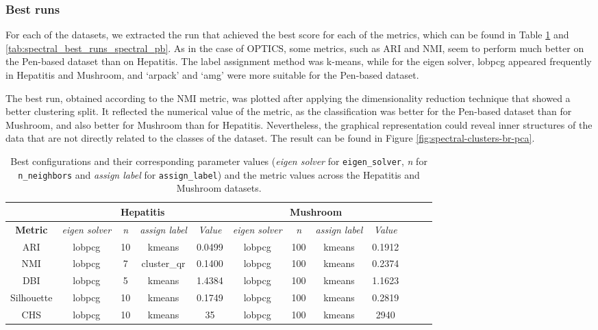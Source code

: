 \subsubsection{Best runs}


For each of the datasets, we extracted the run that achieved the best score for each of the metrics, which can be found in 
Table \ref{tab:spectral_best_runs_spectral_hep-m} and \ref{tab:spectral_best_runs_spectral_pb}. As in the case of OPTICS, 
some metrics, such as ARI and NMI, seem to perform much better on the Pen-based dataset than on Hepatitis. The label
 assignment method was k-means, while for the eigen solver, lobpcg appeared frequently in Hepatitis and Mushroom, and `arpack' 
 and `amg' were more suitable for the Pen-based dataset.



 The best run, obtained according to the NMI metric, was plotted after applying the dimensionality reduction technique that 
 showed a better clustering split. It reflected the numerical value of the metric, as the classification was better for the 
 Pen-based dataset than for Mushroom, and also better for Mushroom than for Hepatitis. Nevertheless, the graphical representation
  could reveal inner structures of the data that are not directly related to the classes of the dataset. The result can be found
   in Figure \ref{fig:spectral-clusters-br-pca}.

\begin{table}[h!]
	\centering
	\begin{tabular}{|c|c|c|c|c|c|c|c|c|c|c|c|}
		\hline
		& \multicolumn{4}{c|}{\textbf{Hepatitis}} & \multicolumn{4}{c|}{\textbf{Mushroom}} \\ \hline
		\textbf{Metric} &  \textit{eigen solver} & \textit{n} & \textit{assign label} & \textit{Value}  &\textit{eigen solver} & \textit{n} & \textit{assign label} & \textit{Value} \\ \hline
		ARI            & lobpcg       & 10   & kmeans & 0.0499 & lobpcg   & 100  & kmeans & 0.1912  \\ \hline
		NMI            & lobpcg        & 7    & cluster\_qr& 0.1400&  lobpcg    & 100  & kmeans & 0.2374 \\ \hline
		DBI            & lobpcg    & 5 &kmeans & 1.4384   & lobpcg   & 100 & kmeans & 1.1623 \\ \hline
		Silhouette     & lobpcg   & 10 &kmeans &  0.1749  & lobpcg  & 100 & kmeans & 0.2819 \\ \hline
		CHS            & lobpcg    & 10 &kmeans & 35   & lobpcg  & 100 & kmeans & 2940 \\ \hline
	\end{tabular}
	\caption{Best configurations and their corresponding parameter values (\textit{eigen solver} for \texttt{eigen\_solver}, \textit{n} for \texttt{n\_neighbors} and \textit{assign label} for \texttt{assign\_label}) and the metric values across the Hepatitis and Mushroom datasets.}
	\label{tab:spectral_best_runs_spectral_hep-m}
\end{table}


